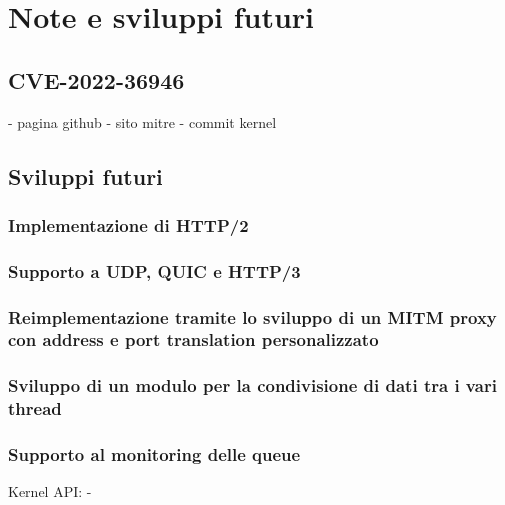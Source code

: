 \chapter{Note e sviluppi futuri}

\section{CVE-2022-36946}

- pagina github
- sito mitre
- commit kernel

\section{Sviluppi futuri}

\subsection{Implementazione di HTTP/2}

\subsection{Supporto a UDP, QUIC e HTTP/3}

\subsection{Reimplementazione tramite lo sviluppo di un MITM proxy con address e port translation personalizzato}

\subsection{Sviluppo di un modulo per la condivisione di dati tra i vari thread}

\subsection{Supporto al monitoring delle queue}

Kernel API:
- 
